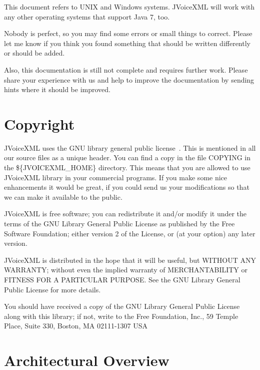 \documentclass[11pt,a4paper]{book}
\begin{document}
This document refers to UNIX and Windows systems. JVoiceXML will work with 
any other operating systems that support Java 7, too.

Nobody is perfect, so you may find some errors or small things to correct.
Please let me know if you think you found something that should be written
differently or should be added.

Also, this documentation is still not complete and requires further work.
Please share your experience with us and help to improve the documentation by
sending hints where it should be improved.

\section{Copyright}
\label{sec:copyright}

JVoiceXML uses the GNU library general public license~\cite{gnu:lgpg}. 
This is mentioned in all our source files as a unique header.
You can find a copy in the file COPYING in the \$\{JVOICEXML\_HOME\}
directory. This means that you are allowed to use JVoiceXML
library in your commercial programs. If you make some nice
enhancements it would be great, if you could send us your
modifications so that we can make it available to the public.

\medskip 

JVoiceXML is free software; you can redistribute it and/or
modify it under the terms of the GNU Library General Public
License as published by the Free Software Foundation; either
version 2 of the License, or (at your option) any later version.

JVoiceXML is distributed in the hope that it will be useful,
but WITHOUT ANY WARRANTY; without even the implied warranty of
MERCHANTABILITY or FITNESS FOR A PARTICULAR PURPOSE. See the GNU
Library General Public License for more details.

You should have received a copy of the GNU Library General Public
License along with this library; if not, write to the Free
Foundation, Inc., 59 Temple Place, Suite 330, Boston, MA  02111-1307  USA

\section{Architectural Overview}
\label{sec:arch-overv}
\end{document}
